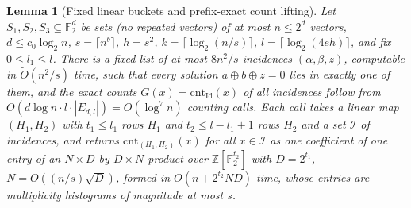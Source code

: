 \documentclass[11pt]{article}
\newtheorem{lemma}[theorem]{Lemma}
\newcommand{\softO}{\widetilde O}
\begin{document}
\begin{lemma}[Fixed linear buckets and prefix-exact count lifting]
\label{lem:fixed-linear-bucket-counting}
Let $S_1,S_2,S_3\subseteq\mathbb F_2^d$ be sets (no repeated vectors) of at
most $n\le2^d$ vectors, $d\le c_0\log_2n$, $s=\lceil n^b\rceil$, $h=s^2$,
$k=\lceil\log_2(n/s)\rceil$, $l=\lceil\log_2(4eh)\rceil$, and fix
$0\le l_1\le l$.  There is a fixed list of at most $8n^2/s$ incidences
$(\alpha,\beta,z)$, computable in $\softO(n^2/s)$ time, such that every
solution $a\oplus b\oplus z=0$ lies in exactly one of them, and the exact
counts $G(x)=\mathrm{cnt}_{\mathrm{Id}}(x)$ of all incidences follow from
$O(d\log n\cdot l\cdot|E_{d,l}|)=O(\log^7n)$ counting calls.  Each call
takes a linear map $(H_1,H_2)$ with $t_1\le l_1$ rows $H_1$ and
$t_2\le l-l_1+1$ rows $H_2$ and a set $\mathcal I$ of incidences, and
returns $\mathrm{cnt}_{(H_1,H_2)}(x)$ for all $x\in\mathcal I$ as one
coefficient of one entry of an $N\times D$ by $D\times N$ product over
$\mathbb Z[\mathbb F_2^{t_2}]$ with $D=2^{t_1}$, $N=O((n/s)\sqrt D)$,
formed in $O(n+2^{t_2}ND)$ time, whose entries are multiplicity
histograms of magnitude at most $s$.
\end{lemma}
\end{document}

